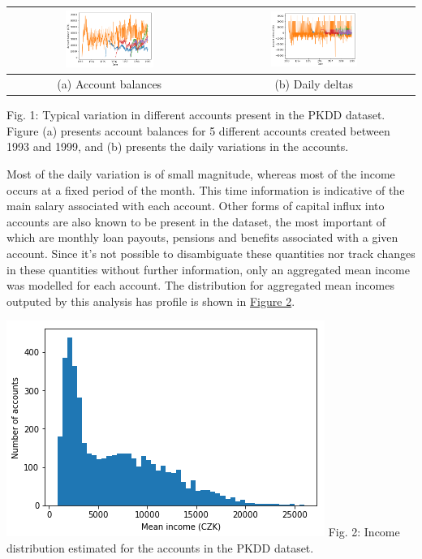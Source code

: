 \documentclass[]{article}
\begin{document}
\begin{longtable}[]{@{}cc@{}}
\toprule
\includegraphics[width=0.45\textwidth]{uploads/upload_da3aa4323224fb439f8fdd1c35ccf4ce.png} &
\includegraphics[width=0.45\textwidth]{uploads/upload_8dad9effb8861f12b99f56905a6069fb.png}\tabularnewline
\midrule
\endhead
(a) Account balances & (b) Daily deltas\tabularnewline
\bottomrule
\end{longtable}

Fig. 1: Typical variation in different accounts present in the PKDD
dataset. Figure (a) presents account balances for 5 different accounts
created between 1993 and 1999, and (b) presents the daily variations in
the accounts.

Most of the daily variation is of small magnitude, whereas most of the
income occurs at a fixed period of the month. This time information is
indicative of the main salary associated with each account. Other forms
of capital influx into accounts are also known to be present in the
dataset, the most important of which are monthly loan payouts, pensions
and benefits associated with a given account. Since it's not possible to
disambiguate these quantities nor track changes in these quantities
without further information, only an aggregated mean income was modelled
for each account. The distribution for aggregated mean incomes outputed
by this analysis has profile is shown in
\protect\hyperlink{fig-income-dist}{Figure 2}.

\includegraphics{uploads/upload_948abd778633d8a556ae60e3eaad3a15.png}
Fig. 2: Income distribution estimated for the accounts in the PKDD
dataset.
\end{document}
